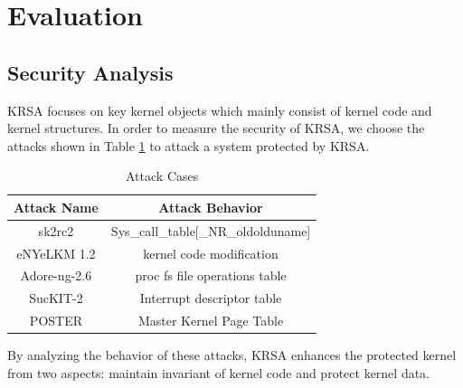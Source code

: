 \documentclass[conference]{IEEEtran}
\begin{document}
\fi

\iffalse

\section{Evaluation}

\subsection{Security Analysis}
KRSA focuses on key kernel objects which mainly consist of kernel code and kernel structures. In order to measure the security of KRSA, we choose the attacks shown in Table \ref{table:attacks} to attack a system protected by KRSA. 

\begin{scriptsize}
\begin{table}[h!]
  \centering
  \caption{Attack Cases}
  \begin{tabular}{c|c}
    \hline
    \textbf{Attack Name    } & \textbf{Attack Behavior} \\
    \hline
      sk2rc2  & Sys\_call\_table[\_NR\_oldolduname] \\
    \hdashline[.4pt/1pt]
      eNYeLKM 1.2 & kernel code modification \\
    \hdashline[.4pt/1pt]
      Adore-ng-2.6  & proc fs file operations table \\
    \hdashline[.4pt/1pt]
      SucKIT-2 & Interrupt descriptor table \\
    \hdashline[.4pt/1pt]
      POSTER & Master Kernel Page Table \\
    \hline
    \end{tabular}
  \label{table:attacks}
\end{table}
\end{scriptsize}

By analyzing the behavior of these attacks, KRSA enhances the protected kernel from two aspects: maintain invariant of kernel code and protect kernel data. 
\end{document}
